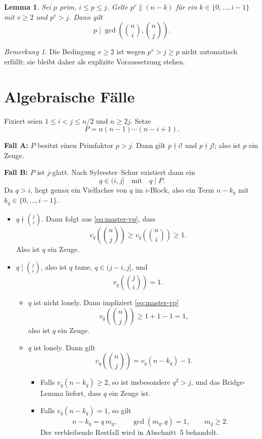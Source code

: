 \documentclass[12pt,a4paper]{article}
\theoremstyle{plain}
\newtheorem{lemma}[theorem]{Lemma}
\theoremstyle{definition}
\theoremstyle{remark}
\newtheorem{remark}[theorem]{Bemerkung}
\begin{document}
	\begin{lemma}
		Sei $p$ prim, $i \leq p \leq j$. Gelte $p^v \parallel (n-k)$ für ein $k \in \{0,\dots,i-1\}$ mit $v \geq 2$ und $p^v > j$. Dann gilt
		\[
		p \mid \gcd\!\left(\binom{n}{i},\binom{n}{j}\right).
		\]
	\end{lemma}
	
	\begin{remark}
		Die Bedingung $v \geq 2$ ist wegen $p^v > j \geq p$ nicht automatisch erfüllt; sie bleibt daher als explizite Voraussetzung stehen.
	\end{remark}
	
	\section{Algebraische Fälle}
	
	Fixiert seien $1 \leq i < j \leq n/2$ und $n \geq 2j$. Setze
	\[
	P = n(n-1)\cdots(n-i+1).
	\]
	
	\textbf{Fall A:} $P$ besitzt einen Primfaktor $p > j$. Dann gilt $p \nmid i!$ und $p \nmid j!$; also ist $p$ ein Zeuge.
	
	\medskip
	
	\textbf{Fall B:} $P$ ist $j$-glatt. Nach Sylvester--Schur existiert dann ein
	\[
	q \in (i,j]
	\quad\text{mit}\quad
	q \mid P.
	\]
	Da $q > i$, liegt genau ein Vielfaches von $q$ im $i$-Block, also ein Term $n-k_q$ mit $k_q \in \{0,\dots,i-1\}$.
	
	\begin{itemize}[leftmargin=2.2cm]
		\item[B-$\alpha$:] $q \nmid \binom{j}{i}$. Dann folgt aus \eqref{eq:master-vp}, dass
		\[
		v_q\!\left(\binom{n}{j}\right) \geq v_q\!\left(\binom{n}{i}\right) \geq 1.
		\]
		Also ist $q$ ein Zeuge.
		
		\item[B-$\beta$:] $q \mid \binom{j}{i}$, also ist $q$ tame, $q \in (j-i,j]$, und
		\[
		v_q\!\left(\binom{j}{i}\right)=1.
		\]
		
		\begin{itemize}
			\item[B-$\beta$-i:] $q$ ist nicht lonely. Dann impliziert \eqref{eq:master-vp}
			\[
			v_q\!\left(\binom{n}{j}\right) \geq 1+1-1 = 1,
			\]
			also ist $q$ ein Zeuge.
			
			\item[B-$\beta$-ii:] $q$ ist lonely. Dann gilt
			\[
			v_q\!\left(\binom{n}{j}\right) = v_q(n-k_q)-1.
			\]
			
			\begin{itemize}
				\item Falls $v_q(n-k_q) \geq 2$, so ist insbesondere $q^2 > j$, und das Bridge-Lemma liefert, dass $q$ ein Zeuge ist.
				\item Falls $v_q(n-k_q)=1$, so gilt
				\[
				n-k_q = q\,m_q,
				\qquad
				\gcd(m_q,q)=1,
				\qquad
				m_q \geq 2.
				\]
				Der verbleibende Restfall wird in Abschnitt~5 behandelt.
			\end{itemize}
		\end{itemize}
	\end{itemize}
	
\end{document}
